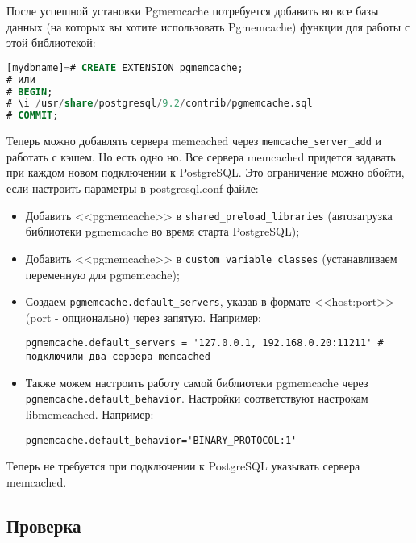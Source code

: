 После успешной установки Pgmemcache потребуется добавить во все базы данных (на которых вы хотите использовать Pgmemcache) функции для работы с этой библиотекой:

\begin{lstlisting}[language=SQL,label=lst:pgcache5,caption=Настройка]
% psql [mydbname] [pguser]
[mydbname]=# CREATE EXTENSION pgmemcache;
# или
# BEGIN;
# \i /usr/share/postgresql/9.2/contrib/pgmemcache.sql
# COMMIT;
\end{lstlisting}

Теперь можно добавлять сервера memcached через \lstinline!memcache_server_add! и работать с кэшем. Но есть одно но. Все сервера memcached придется задавать при каждом новом подключении к PostgreSQL. Это ограничение можно обойти, если настроить параметры в postgresql.conf файле:

\begin{itemize}
  \item Добавить <<pgmemcache>> в \lstinline!shared_preload_libraries! (автозагрузка библиотеки pgmemcache во время старта PostgreSQL);
  \item Добавить <<pgmemcache>> в \lstinline!custom_variable_classes! (устанавливаем переменную для pgmemcache);
  \item Создаем \lstinline!pgmemcache.default_servers!, указав в формате <<host:port>> (port - опционально) через запятую. Например:

\begin{lstlisting}[label=lst:pgcache6,caption=Настройка default\_servers]
pgmemcache.default_servers = '127.0.0.1, 192.168.0.20:11211' # подключили два сервера memcached
\end{lstlisting}

\item Также можем настроить работу самой библиотеки pgmemcache через \lstinline!pgmemcache.default_behavior!. Настройки соответствуют настрокам libmemcached. Например:

\begin{lstlisting}[label=lst:pgcache7,caption=Настройка pgmemcache]
pgmemcache.default_behavior='BINARY_PROTOCOL:1'
\end{lstlisting}

\end{itemize}

Теперь не требуется при подключении к PostgreSQL указывать сервера memcached.

\subsection{Проверка}

